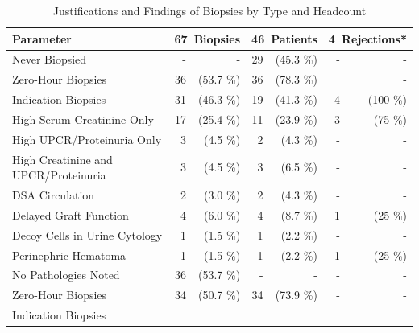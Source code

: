 
\begin{table}[tbp]
    \centering
    \caption{Justifications and Findings of Biopsies by Type and Headcount}
    {\small
    \begin{tabular}{l rr rr rr}
        \toprule
        Parameter & 
        \multicolumn{2}{c}{67~Biopsies} & 
        \multicolumn{2}{c}{46~Patients} & 
        \multicolumn{2}{c}{4~Rejections*} \\\midrule
        Never Biopsied & 
        - & - & 29 & (45.3 \%) & - & - \\
        Zero-Hour Biopsies & 
        36 & (53.7 \%) & 36 & (78.3 \%) & & - \\
        Indication Biopsies & 
        31 & (46.3 \%) & 19 & (41.3 \%) & 4 & (100 \%) \\
        \hspace{2em}High Serum Creatinine Only & 
        17 & (25.4 \%) & 11 & (23.9 \%) & 3 & (75 \%) \\
        \hspace{2em}High UPCR/Proteinuria Only & 
        3 & (4.5 \%) & 2 & (4.3 \%) & - & - \\
        \hspace{2em}High Creatinine and UPCR/Proteinuria & 
        3 & (4.5 \%) & 3 & (6.5 \%) & - & - \\
        \hspace{2em}DSA Circulation & 
        2 & (3.0 \%) & 2 & (4.3 \%) & - & - \\
        \hspace{2em}Delayed Graft Function & 
        4 & (6.0 \%) & 4 & (8.7 \%) & 1 & (25 \%) \\
        \hspace{2em}Decoy Cells in Urine Cytology & 
        1 & (1.5 \%) & 1 & (2.2 \%) & - & - \\
        \hspace{2em}Perinephric Hematoma & 
        1 & (1.5 \%) & 1 & (2.2 \%) & 1 & (25 \%) \\
        \hline
        No Pathologies Noted &
        36 & (53.7 \%) & - & - & - & - \\
        \hspace{2em}Zero-Hour Biopsies & %
        34 & (50.7 \%) & 34 & (73.9 \%) & - & - \\
        \hspace{2em}Indication Biopsies & %

\end{tabular}}
\end{table}
